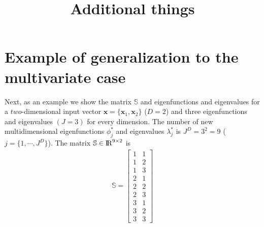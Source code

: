 \documentclass[onecolumn,a4paper,11pt]{article}
\title{Additional things}
\date{}
\begin{document}
\maketitle

\tableofcontents

\section{Example of generalization to the multivariate case}

Next, as an example we show the matrix $\mathbb{S}$ and eigenfunctions and eigenvalues for a $two$-dimensional input vector $\bm{x}=\{\bm{x}_1,\bm{x}_2\}$ ($D=2$) and three eigenfunctions and eigenvalues $(J=3)$ for every dimension. The number of new multidimensional eigenfunctions $\phi^{\ast}_j$ and eigenvalues $\lambda^{\ast}_j$ is $J^D=3^2=9$ ($j=\{1,\cdots,J^D\}$). The matrix $\mathbb{S}\in {\rm I\!R}^{9 \times 2}$ is
%
\begin{eqnarray}
\mathbb{S}=
\left[ {\begin{array}{cc}
1 & 1 \nonumber \\
1 & 2 \\
1 & 3 \\
2 & 1 \\
2 & 2 \\
2 & 3 \\
3 & 1 \\
3 & 2 \\
3 & 3
\end{array} } \right]
\end{eqnarray} 
\end{document}

